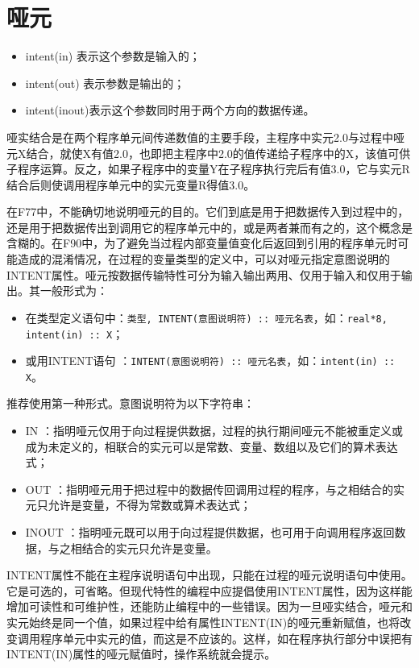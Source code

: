 \section{哑元}
\begin{itemize}
\item intent(in) 表示这个参数是输入的；
\item intent(out) 表示参数是输出的；
\item intent(inout)表示这个参数同时用于两个方向的数据传递。
\end{itemize}

哑实结合是在两个程序单元间传递数值的主要手段，主程序中实元2.0与过程中哑元X结合，就使X有值2.0，也即把主程序中2.0的值传递给子程序中的X，该值可供子程序运算。反之，如果子程序中的变量Y在子程序执行完后有值3.0，它与实元R结合后则使调用程序单元中的实元变量R得值3.0。

在F77中，不能确切地说明哑元的目的。它们到底是用于把数据传入到过程中的，还是用于把数据传出到调用它的程序单元中的，或是两者兼而有之的，这个概念是含糊的。在F90中，为了避免当过程内部变量值变化后返回到引用的程序单元时可能造成的混淆情况，在过程的变量类型的定义中，可以对哑元指定意图说明的INTENT属性。哑元按数据传输特性可分为输入输出两用、仅用于输入和仅用于输出。其一般形式为：
\begin{itemize}
\item 在类型定义语句中：\verb|类型, INTENT(意图说明符) :: 哑元名表|，如：\verb|real*8, intent(in) :: X|；
\item 或用INTENT语句 ：\verb|INTENT(意图说明符) :: 哑元名表|，如：\verb|intent(in) :: X|。
\end{itemize}
推荐使用第一种形式。意图说明符为以下字符串：
\begin{itemize}
\item IN ：指明哑元仅用于向过程提供数据，过程的执行期间哑元不能被重定义或成为未定义的，相联合的实元可以是常数、变量、数组以及它们的算术表达式；

\item OUT ：指明哑元用于把过程中的数据传回调用过程的程序，与之相结合的实元只允许是变量，不得为常数或算术表达式；

\item INOUT ：指明哑元既可以用于向过程提供数据，也可用于向调用程序返回数据，与之相结合的实元只允许是变量。
\end{itemize}

INTENT属性不能在主程序说明语句中出现，只能在过程的哑元说明语句中使用。它是可选的，可省略。但现代特性的编程中应提倡使用INTENT属性，因为这样能增加可读性和可维护性，还能防止编程中的一些错误。因为一旦哑实结合，哑元和实元始终是同一个值，如果过程中给有属性INTENT(IN)的哑元重新赋值，也将改变调用程序单元中实元的值，而这是不应该的。这样，如在程序执行部分中误把有INTENT(IN)属性的哑元赋值时，操作系统就会提示。


